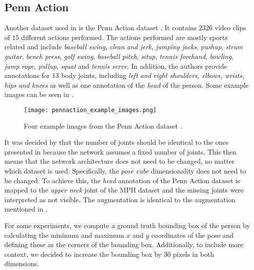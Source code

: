 \subsection{Penn Action}
\label{sec:exp-penn}

Another dataset used in \cite{luvizon_2d/3d_2018} is the Penn Action dataset \cite{zhang_actemes_2013}.
It contains $2326$ video clips of $15$ different actions performed.
The actions performed are mostly sports related and include \textit{baseball swing}, \textit{clean and jerk}, \textit{jumping jacks}, \textit{pushup}, \textit{strum guitar}, \textit{bench press}, \textit{golf swing}, \textit{baseball pitch}, \textit{situp}, \textit{tennis forehand}, \textit{bowling}, \textit{jump rope}, \textit{pullup}, \textit{squat} and \textit{tennis serve}.
In addition, the authors provide annotations for $13$ body joints,
including \textit{left and right shoulders, elbows, wrists, hips and knees} as well as one annotation of the \textit{head} of the person.
Some example images can be seen in . 

\begin{figure}[htb!]
    \centering
    \texttt{[image: pennaction\_example\_images.png]}
    \caption{Four example images from the Penn Action dataset \cite{zhang_actemes_2013}. }
    \label{fig:pennaction_example_images}
\end{figure}

It was decided by \cite{luvizon_2d/3d_2018} that the number of joints should be identical to the ones presented in \cite{andriluka_2d_2014}  because the network assumes a fixed number of joints.
This then means that the network architecture does not need to be changed, no matter which dataset is used.
Specifically, the \textit{pose cube} dimensionality does not need to be changed.
To achieve this, the \textit{head} annotation of the Penn Action dataset is mapped to the \textit{upper neck} joint of the MPII dataset and the missing joints were interpreted as not visible.
The augmentation is identical to the augmentation mentioned in . %

For some experiments, we compute a ground truth bounding box of the person by calculating the minimum and maximum $x$ and $y$ coordinates of the pose and defining these as the corners of the bounding box.
Additionally, to include more context, we decided to increase the bounding box by $30$ pixels in both dimensions.

